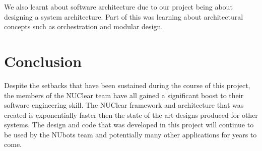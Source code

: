\documentclass[english,12pt]{scrartcl}
\begin{document}
		We also learnt about software architecture due to our project being about designing a system architecture.
		Part of this was learning about architectural concepts such as orchestration and modular design.

\section{Conclusion}
	Despite the setbacks that have been sustained during the course of this project, the members of the NUClear team have all gained a significant boost to their software engineering skill.
	The NUClear framework and architecture that was created is exponentially faster then the state of the art designs produced for other systems.
	The design and code that was developed in this project will continue to be used by the NUbots team and potentially many other applications for years to come.
\end{document}
